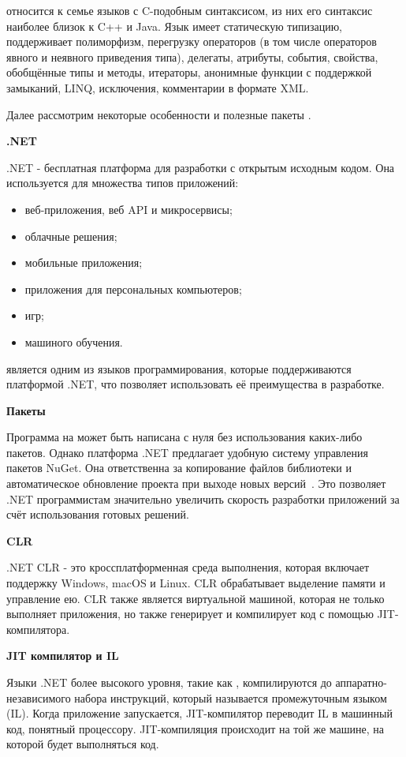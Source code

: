 \csharp относится к семье языков с C-подобным синтаксисом, из них его синтаксис наиболее близок к C++ и Java. Язык имеет статическую типизацию, поддерживает полиморфизм, перегрузку операторов (в том числе операторов явного и неявного приведения типа), делегаты, атрибуты, события, свойства, обобщённые типы и методы, итераторы, анонимные функции с поддержкой замыканий, LINQ, исключения, комментарии в формате XML.

Далее рассмотрим некоторые особенности и полезные пакеты \csharp.

\bigskip
\textbf{.NET}

.NET - бесплатная платформа для разработки с открытым исходным кодом. Она используется для множества типов приложений:
\begin{itemize}
    \item веб-приложения, веб API и микросервисы;
    \item облачные решения;
    \item мобильные приложения;
    \item приложения для персональных компьютеров;
    \item игр;
    \item машиного обучения.
\end{itemize}

\csharp является одним из языков программирования, которые поддерживаются платформой .NET, что позволяет использовать её преимущества в разработке.

\bigskip
\textbf{Пакеты}

Программа на \csharp может быть написана с нуля без использования каких-либо пакетов. Однако платформа .NET предлагает удобную систему управления пакетов NuGet. Она ответственна за копирование файлов библиотеки и автоматическое обновление проекта при выходе новых версий~\cite{wiki_nuget}. Это позволяет .NET программистам значительно увеличить скорость разработки приложений за счёт использования готовых решений.

\bigskip
\textbf{CLR}

.NET CLR - это кроссплатформенная среда выполнения, которая включает поддержку Windows, macOS и Linux. CLR обрабатывает выделение памяти и управление ею. CLR также является виртуальной машиной, которая не только выполняет приложения, но также генерирует и компилирует код с помощью JIT-компилятора.

\newpage
\textbf{JIT компилятор и IL}

Языки .NET более высокого уровня, такие как \csharp, компилируются до аппаратно-независимого набора инструкций, который называется промежуточным языком (IL). Когда приложение запускается, JIT-компилятор переводит IL в машинный код, понятный процессору. JIT-компиляция происходит на той же машине, на которой будет выполняться код.

